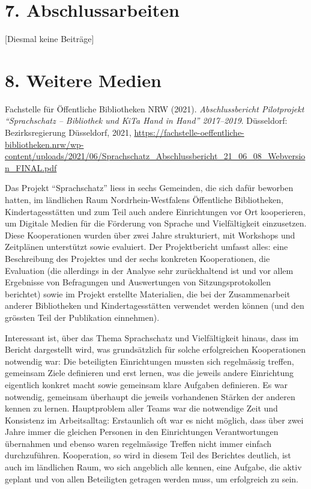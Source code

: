 \documentclass[a4paper,
fontsize=11pt,
oneside,
numbers=noperiodatend,
parskip=half-,
bibliography=totoc,
final
]{scrartcl}
\begin{document}
\hypertarget{abschlussarbeiten}{%
\section{7. Abschlussarbeiten}\label{abschlussarbeiten}}

{[}Diesmal keine Beiträge{]}

\hypertarget{weitere-medien}{%
\section{8. Weitere Medien}\label{weitere-medien}}

Fachstelle für Öffentliche Bibliotheken NRW (2021).
\emph{Abschlussbericht Pilotprojekt \enquote{Sprachschatz -- Bibliothek
und KiTa Hand in Hand} 2017--2019}. Düsseldorf: Bezirksregierung
Düsseldorf, 2021,
\url{https://fachstelle-oeffentliche-bibliotheken.nrw/wp-content/uploads/2021/06/Sprachschatz_Abschlussbericht_21_06_08_Webversion_FINAL.pdf}

Das Projekt \enquote{Sprachschatz} liess in sechs Gemeinden, die sich
dafür beworben hatten, im ländlichen Raum Nordrhein-Westfalens
Öffentliche Bibliotheken, Kindertagesstätten und zum Teil auch andere
Einrichtungen vor Ort kooperieren, um Digitale Medien für die Förderung
von Sprache und Vielfältigkeit einzusetzen. Diese Kooperationen wurden
über zwei Jahre strukturiert, mit Workshops und Zeitplänen unterstützt
sowie evaluiert. Der Projektbericht umfasst alles: eine Beschreibung des
Projektes und der sechs konkreten Kooperationen, die Evaluation (die
allerdings in der Analyse sehr zurückhaltend ist und vor allem
Ergebnisse von Befragungen und Auswertungen von Sitzungsprotokollen
berichtet) sowie im Projekt erstellte Materialien, die bei der
Zusammenarbeit anderer Bibliotheken und Kindertagesstätten verwendet
werden können (und den grössten Teil der Publikation einnehmen).

Interessant ist, über das Thema Sprachschatz und Vielfältigkeit hinaus,
dass im Bericht dargestellt wird, was grundsätzlich für solche
erfolgreichen Kooperationen notwendig war: Die beteiligten Einrichtungen
mussten sich regelmässig treffen, gemeinsam Ziele definieren und erst
lernen, was die jeweils andere Einrichtung eigentlich konkret macht
sowie gemeinsam klare Aufgaben definieren. Es war notwendig, gemeinsam
überhaupt die jeweils vorhandenen Stärken der anderen kennen zu lernen.
Hauptproblem aller Teams war die notwendige Zeit und Konsistenz im
Arbeitsalltag: Erstaunlich oft war es nicht möglich, dass über zwei
Jahre immer die gleichen Personen in den Einrichtungen Verantwortungen
übernahmen und ebenso waren regelmässige Treffen nicht immer einfach
durchzuführen. Kooperation, so wird in diesem Teil des Berichtes
deutlich, ist auch im ländlichen Raum, wo sich angeblich alle kennen,
eine Aufgabe, die aktiv geplant und von allen Beteiligten getragen
werden muss, um erfolgreich zu sein.
\end{document}
